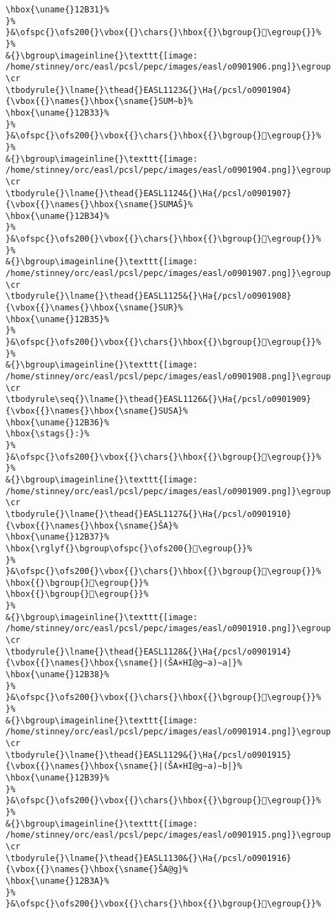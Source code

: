 \begin{verbatim}
\hbox{\uname{}12B31}%
}%
}&\ofspc{}\ofs200{}\vbox{{}\chars{}\hbox{{}\bgroup{}𒬱\egroup{}}%
}%
&{}\bgroup\imageinline{}\texttt{[image: /home/stinney/orc/easl/pcsl/pepc/images/easl/o0901906.png]}\egroup
\cr
\tbodyrule{}\lname{}\thead{}EASL1123&{}\Ha{/pcsl/o0901904}{\vbox{{}\names{}\hbox{\sname{}SUM∼b}%
\hbox{\uname{}12B33}%
}%
}&\ofspc{}\ofs200{}\vbox{{}\chars{}\hbox{{}\bgroup{}𒬳\egroup{}}%
}%
&{}\bgroup\imageinline{}\texttt{[image: /home/stinney/orc/easl/pcsl/pepc/images/easl/o0901904.png]}\egroup
\cr
\tbodyrule{}\lname{}\thead{}EASL1124&{}\Ha{/pcsl/o0901907}{\vbox{{}\names{}\hbox{\sname{}SUMAŠ}%
\hbox{\uname{}12B34}%
}%
}&\ofspc{}\ofs200{}\vbox{{}\chars{}\hbox{{}\bgroup{}𒬴\egroup{}}%
}%
&{}\bgroup\imageinline{}\texttt{[image: /home/stinney/orc/easl/pcsl/pepc/images/easl/o0901907.png]}\egroup
\cr
\tbodyrule{}\lname{}\thead{}EASL1125&{}\Ha{/pcsl/o0901908}{\vbox{{}\names{}\hbox{\sname{}SUR}%
\hbox{\uname{}12B35}%
}%
}&\ofspc{}\ofs200{}\vbox{{}\chars{}\hbox{{}\bgroup{}𒬵\egroup{}}%
}%
&{}\bgroup\imageinline{}\texttt{[image: /home/stinney/orc/easl/pcsl/pepc/images/easl/o0901908.png]}\egroup
\cr
\tbodyrule\seq{}\lname{}\thead{}EASL1126&{}\Ha{/pcsl/o0901909}{\vbox{{}\names{}\hbox{\sname{}SUSA}%
\hbox{\uname{}12B36}%
\hbox{\stags{}:}%
}%
}&\ofspc{}\ofs200{}\vbox{{}\chars{}\hbox{{}\bgroup{}𒬶\egroup{}}%
}%
&{}\bgroup\imageinline{}\texttt{[image: /home/stinney/orc/easl/pcsl/pepc/images/easl/o0901909.png]}\egroup
\cr
\tbodyrule{}\lname{}\thead{}EASL1127&{}\Ha{/pcsl/o0901910}{\vbox{{}\names{}\hbox{\sname{}ŠA}%
\hbox{\uname{}12B37}%
\hbox{\rglyf{}\bgroup\ofspc{}\ofs200{}𒬷\egroup{}}%
}%
}&\ofspc{}\ofs200{}\vbox{{}\chars{}\hbox{{}\bgroup{}𒬻\egroup{}}%
\hbox{{}\bgroup{}𒬼\egroup{}}%
\hbox{{}\bgroup{}𒬷\egroup{}}%
}%
&{}\bgroup\imageinline{}\texttt{[image: /home/stinney/orc/easl/pcsl/pepc/images/easl/o0901910.png]}\egroup
\cr
\tbodyrule{}\lname{}\thead{}EASL1128&{}\Ha{/pcsl/o0901914}{\vbox{{}\names{}\hbox{\sname{}|(ŠA×HI@g∼a)∼a|}%
\hbox{\uname{}12B38}%
}%
}&\ofspc{}\ofs200{}\vbox{{}\chars{}\hbox{{}\bgroup{}𒬸\egroup{}}%
}%
&{}\bgroup\imageinline{}\texttt{[image: /home/stinney/orc/easl/pcsl/pepc/images/easl/o0901914.png]}\egroup
\cr
\tbodyrule{}\lname{}\thead{}EASL1129&{}\Ha{/pcsl/o0901915}{\vbox{{}\names{}\hbox{\sname{}|(ŠA×HI@g∼a)∼b|}%
\hbox{\uname{}12B39}%
}%
}&\ofspc{}\ofs200{}\vbox{{}\chars{}\hbox{{}\bgroup{}𒬹\egroup{}}%
}%
&{}\bgroup\imageinline{}\texttt{[image: /home/stinney/orc/easl/pcsl/pepc/images/easl/o0901915.png]}\egroup
\cr
\tbodyrule{}\lname{}\thead{}EASL1130&{}\Ha{/pcsl/o0901916}{\vbox{{}\names{}\hbox{\sname{}ŠA@g}%
\hbox{\uname{}12B3A}%
}%
}&\ofspc{}\ofs200{}\vbox{{}\chars{}\hbox{{}\bgroup{}𒬺\egroup{}}%

\end{verbatim}
